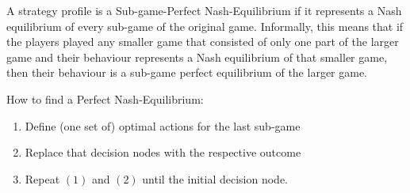 \begin{definition}  
A strategy profile is a Sub-game-Perfect Nash-Equilibrium if it represents a Nash equilibrium of every sub-game of the original game. Informally, this means that if the players played any smaller game that consisted of only one part of the larger game and their behaviour represents a Nash equilibrium of that smaller game, then their behaviour is a sub-game perfect equilibrium of the larger game. 
\end{definition}
How to find a Perfect Nash-Equilibrium:
\begin{enumerate}
	\item Define (one set of) optimal actions for the last sub-game
	\item Replace that decision nodes with the respective outcome
	\item Repeat $(1)$ and $(2)$ until the initial decision node.
\end{enumerate}

